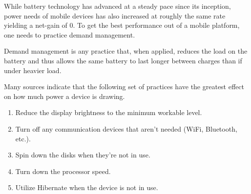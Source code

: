 \documentclass[letterpaper]{article}
\begin{document}
\huge{

  While battery technology has advanced at a steady pace since its inception,
  power needs of mobile devices has also increased at roughly the same rate
  yielding a net-gain of 0.  To get the best performance out of a mobile
  platform, one needs to practice demand management.

  Demand management is any practice that, when applied, reduces the load on the
  battery and thus allows the same battery to last longer between charges than
  if under heavier load.

  Many sources indicate that the following set of practices have the greatest
  effect on how much power a device is drawing.

  \begin{enumerate}

  \item Reduce the display brightness to the minimum workable level.

  \item Turn off any communication devices that aren't needed (WiFi, Bluetooth, etc.).

  \item Spin down the disks when they're not in use.

  \item Turn down the processor speed.

  \item Utilize Hibernate when the device is not in use.

  \end{enumerate}}
\end{document}
